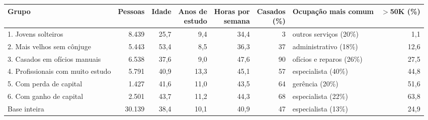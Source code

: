 \setlength{\tabcolsep}{3pt}
\begin{tabular}{lrrrrrlr}
\toprule
Grupo & Pessoas & Idade & \shortstack{Anos de\\estudo} & \shortstack{Horas por\\semana} & \shortstack{Casados\\(\%)} & Ocupação mais comum & \shortstack{$>$50K\\(\%)} \\
\midrule
1. Jovens solteiros & 8.439 & 25,7 & 9,4 & 34,4 & 3 & outros serviços (20\%) & 1,1 \\
2. Mais velhos sem cônjuge & 5.443 & 53,4 & 8,5 & 36,3 & 37 & administrativo (18\%) & 12,6 \\
3. Casados em ofícios manuais & 6.538 & 37,6 & 9,0 & 47,6 & 90 & ofícios e reparos (26\%) & 27,5 \\
4. Profissionais com muito estudo & 5.791 & 40,9 & 13,3 & 45,1 & 57 & especialista (40\%) & 44,8 \\
5. Com perda de capital & 1.427 & 41,6 & 11,0 & 43,5 & 64 & gerência (20\%) & 51,6 \\
6. Com ganho de capital & 2.501 & 43,7 & 11,2 & 44,3 & 68 & especialista (22\%) & 63,8 \\
\midrule
Base inteira & 30.139 & 38,4 & 10,1 & 40,9 & 47 & especialista (13\%) & 24,9 \\
\bottomrule
\end{tabular}
